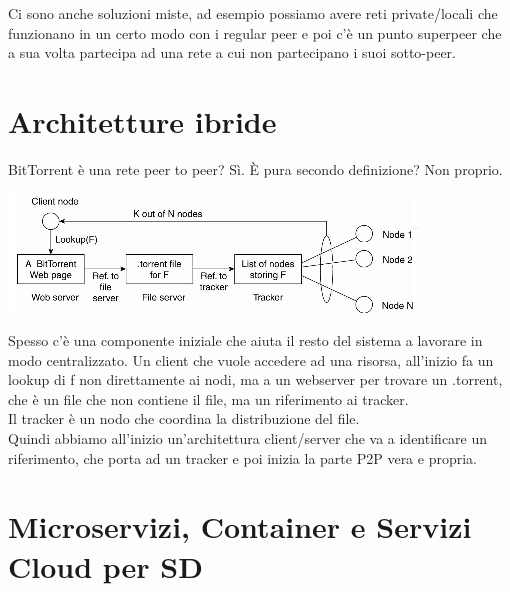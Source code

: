 Ci sono anche soluzioni miste, ad esempio possiamo avere reti private/locali che funzionano in un certo modo con i regular peer e poi c'è un punto superpeer che a sua volta partecipa ad una rete a cui non partecipano i suoi sotto-peer.

\section{Architetture ibride}
BitTorrent è una rete peer to peer? Sì. È pura secondo definizione? Non proprio.\\ 
\begin{center}
    \includegraphics[width = .7\textwidth]{images/lezione2/Ibride.png}
\end{center}
Spesso c'è una componente iniziale che aiuta il resto del sistema a lavorare in modo centralizzato. Un client che vuole accedere ad una risorsa, all'inizio fa un lookup di f non direttamente ai nodi, ma a un webserver per trovare un .torrent, che è un file che non contiene il file, ma un riferimento ai tracker. \\
Il tracker è un nodo che coordina la distribuzione del file. \\
Quindi abbiamo all'inizio un'architettura client/server che va a identificare un riferimento, che porta ad un tracker e poi inizia la parte P2P vera e propria.


\section{Microservizi, Container e Servizi Cloud per SD}
